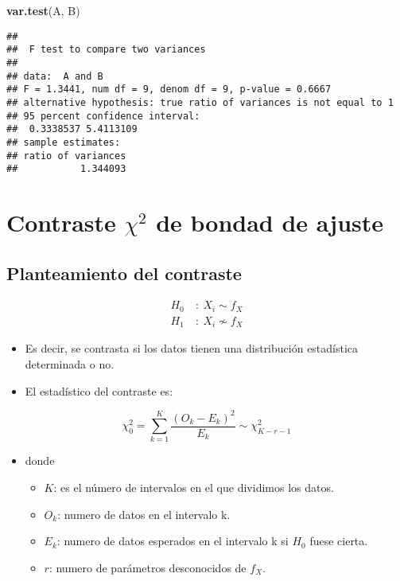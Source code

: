 \documentclass[]{article}
\newenvironment{Shaded}{\begin{snugshade}}{\end{snugshade}}
\newcommand{\KeywordTok}[1]{\textcolor[rgb]{0.13,0.29,0.53}{\textbf{#1}}}
\newcommand{\NormalTok}[1]{#1}
\providecommand{\tightlist}{%
  \setlength{\itemsep}{0pt}\setlength{\parskip}{0pt}}
\begin{document}
\begin{Shaded}
\begin{Highlighting}[]
\KeywordTok{var.test}\NormalTok{(A, B)}
\end{Highlighting}
\end{Shaded}

\begin{verbatim}
## 
##  F test to compare two variances
## 
## data:  A and B
## F = 1.3441, num df = 9, denom df = 9, p-value = 0.6667
## alternative hypothesis: true ratio of variances is not equal to 1
## 95 percent confidence interval:
##  0.3338537 5.4113109
## sample estimates:
## ratio of variances 
##           1.344093
\end{verbatim}

\section{\texorpdfstring{Contraste \(\chi^2\) de bondad de
ajuste}{Contraste \textbackslash{}chi\^{}2 de bondad de ajuste}}\label{contraste-chi2-de-bondad-de-ajuste}

\subsection{Planteamiento del
contraste}\label{planteamiento-del-contraste-1}

\[
\begin{align}
H_0 \ & : \ X_i \sim f_X \\
H_1 \ & : \ X_i \nsim f_X
\end{align}
\]

\begin{itemize}
\item
  Es decir, se contrasta si los datos tienen una distribución
  estadística determinada o no.
\item
  El estadístico del contraste es:
\end{itemize}

\[
\chi^2_0 = \sum_{k=1}^{K} \frac{(O_k - E_k)^2}{E_k} \sim \chi^2_{K-r-1}
\]

\begin{itemize}
\tightlist
\item
  donde

  \begin{itemize}
  \tightlist
  \item
    \(K\): es el número de intervalos en el que dividimos los datos.
  \item
    \(O_k\): numero de datos en el intervalo k.
  \item
    \(E_k\): numero de datos esperados en el intervalo k si \(H_0\)
    fuese cierta.
  \item
    \(r\): numero de parámetros desconocidos de \(f_X\).
  \end{itemize}
\end{itemize}
\end{document}
